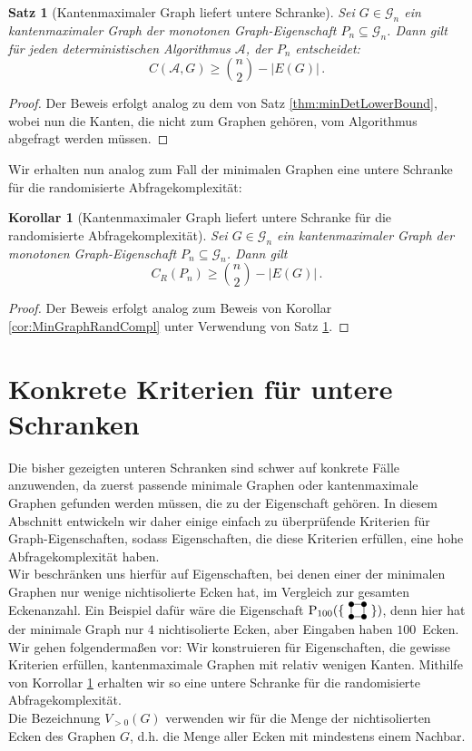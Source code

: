 \documentclass[10pt,a4paper, footheight=1mm, bibliography=totoc]{scrreprt}
\newtheorem{Satz}[definition]{Satz}
\newtheorem{corollary}[definition]{Korollar}
\theoremstyle{definition}
\newcommand{\Square}{
\begin{tikzpicture}[main_node/.style={circle,fill=black},
inner sep=1.5pt, baseline=2pt]

    \node[main_node] (1) at (0,0) {};
    \node[main_node] (2) at (0.35, 0)  {};
    \node[main_node] (3) at (0.35, 0.35) {};
    \node[main_node] (4) at (0, 0.35) {};

    \draw (1) -- (2) -- (3) -- (4) -- (1);
\end{tikzpicture}
}
\begin{document}
\begin{Satz}[Kantenmaximaler Graph liefert untere Schranke]
\label{thm:EdgeMaxGraphLowerBound}
Sei $G\in \mathcal{G}_n$ ein kantenmaximaler Graph der monotonen
Graph-Eigenschaft $P_n \subseteq \mathcal{G}_n$.
Dann gilt für jeden deterministischen Algorithmus $\mathcal{A}$,
der $P_n$ entscheidet: 
$$ C(\mathcal{A}, G) \geq \binom{n}{2} - |E(G)|\,.$$
\end{Satz}
\begin{proof}
Der Beweis erfolgt analog zu dem von Satz \ref{thm:minDetLowerBound},
wobei nun die Kanten, die nicht zum Graphen gehören, vom Algorithmus
abgefragt werden müssen.
\end{proof}
Wir erhalten nun analog zum Fall der minimalen Graphen eine untere
Schranke für die randomisierte Abfragekomplexität:
\begin{corollary} [Kantenmaximaler Graph liefert untere Schranke
für die randomisierte Abfragekomplexität]
\label{thm:EdgeMaximalRandCompl}
Sei $G\in\mathcal{G}_n$ ein kantenmaximaler Graph der monotonen
Graph-Eigenschaft $P_n \subseteq \mathcal{G}_n$.
Dann gilt
$$ C_R(P_n) \geq \binom{n}{2} - |E(G)|\,.$$
\end{corollary}
\begin{proof}
Der Beweis erfolgt analog zum Beweis von Korollar \ref{cor:MinGraphRandCompl}
unter Verwendung von Satz \ref{thm:EdgeMaxGraphLowerBound}.
\end{proof}

\section{Konkrete Kriterien für untere Schranken}
Die bisher gezeigten unteren Schranken sind schwer auf konkrete
Fälle anzuwenden, da zuerst passende minimale Graphen oder kantenmaximale
Graphen gefunden werden müssen, die zu der Eigenschaft gehören.
In diesem Abschnitt entwickeln wir daher einige einfach zu überprüfende
Kriterien für Graph-Eigenschaften, sodass Eigenschaften, die diese
Kriterien erfüllen, eine hohe Abfragekomplexität haben.\\
Wir beschränken uns hierfür auf Eigenschaften, bei denen einer
der minimalen Graphen nur wenige nichtisolierte Ecken hat,
im Vergleich zur gesamten Eckenanzahl. Ein Beispiel dafür wäre
die Eigenschaft $\operatorname{P}_{100}(\{ \ \Square \ \})$,
denn hier hat der minimale Graph nur $4$ nichtisolierte Ecken,
aber Eingaben haben $100$~Ecken. \\
Wir gehen folgendermaßen vor: Wir konstruieren für Eigenschaften,
die gewisse Kriterien erfüllen, kantenmaximale Graphen mit 
relativ wenigen Kanten. Mithilfe von Korrollar 
\ref{thm:EdgeMaximalRandCompl} erhalten wir so eine untere Schranke
für die randomisierte Abfragekomplexität. \\
Die Bezeichnung $V_{>0}(G)$ verwenden wir für die
Menge der nichtisolierten Ecken des Graphen $G$,
d.h. die Menge aller Ecken mit mindestens einem Nachbar.
\end{document}
